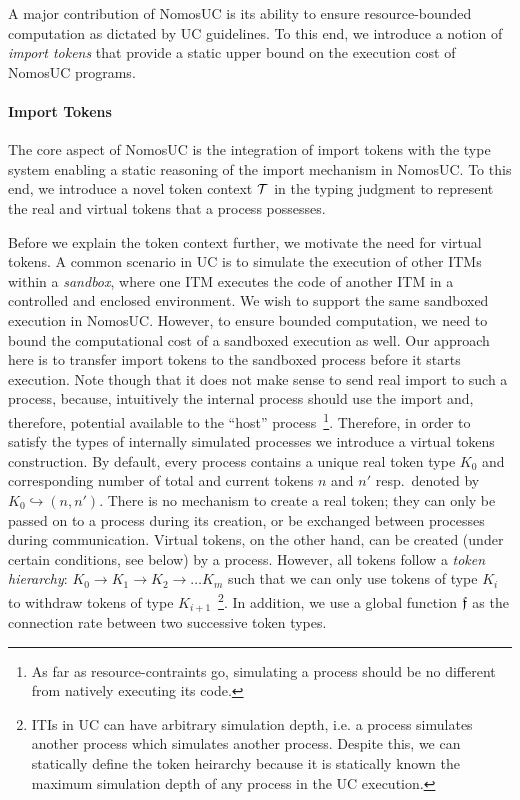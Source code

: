 A major contribution of NomosUC is its ability to ensure resource-bounded computation
as dictated by UC guidelines.
To this end, we introduce a notion of \emph{import tokens} that provide a static upper
bound on the execution cost of NomosUC programs.

\paragraph*{\textbf{Import Tokens}}
The core aspect of NomosUC is the integration of import tokens with the type system
enabling a static reasoning of the import mechanism in NomosUC.
To this end, we introduce a novel token context $\mathcal{T}$ in the typing judgment to
represent the real and virtual tokens that a process possesses.

Before we explain the token context further, we motivate the need for virtual tokens.
A common scenario in UC is to simulate the execution of other ITMs within a \emph{sandbox},
where one ITM executes the code of another ITM in a controlled and enclosed environment.
We wish to support the same sandboxed execution in NomosUC.
However, to ensure bounded computation, we need to bound the computational cost of a
sandboxed execution as well.
Our approach here is to transfer import tokens to the sandboxed process before it starts execution.
Note though that it does not make sense to
send real import to such a process, because, intuitively the internal process should use the
import and, therefore, potential available to the ``host'' process~\footnote{As far as resource-contraints go, simulating a process should be no different from natively executing its code.}. Therefore, in 
order to satisfy the types of internally simulated processes we introduce a virtual 
tokens construction. 
By default, every process contains a unique real token type $K_0$
and corresponding number of total and current tokens $n$ and $n'$ resp.\
denoted by $K_0 \hookrightarrow (n, n')$.
There is no mechanism to create a real token; they can only be passed on to
a process during its creation, or be exchanged between processes during communication.
Virtual tokens, on the other hand, can be created (under certain conditions,
see below) by a process.
However, all tokens follow a \emph{token hierarchy}: $K_0 \to K_1 \to K_2 \to \ldots K_m$
such that we can only use tokens of type $K_i$ to withdraw tokens of type
$K_{i+1}$~\footnote{ITIs in UC can have arbitrary simulation depth, i.e. a process simulates another process which simulates another process. Despite this, we can statically define the token heirarchy because it is statically known the maximum simulation depth of any process in the UC execution.}.
In addition, we use a global function $\mathfrak{f}$ as the connection
rate between two successive token types.

